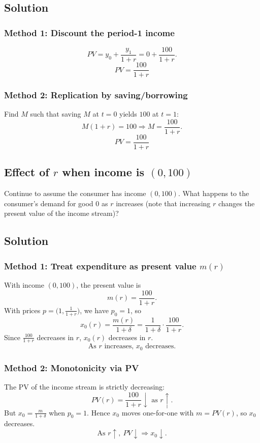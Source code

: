 \documentclass[12pt]{article}
\begin{document}
\subsection*{Solution}
\subsubsection*{Method 1: Discount the period-1 income}
\[
PV=y_0+\frac{y_1}{1+r}=0+\frac{100}{1+r}.
\]
\[
\boxed{\;PV=\frac{100}{1+r}\;}
\]

\subsubsection*{Method 2: Replication by saving/borrowing}
Find \(M\) such that saving \(M\) at \(t=0\) yields \(100\) at \(t=1\):
\[
M(1+r)=100\Rightarrow M=\frac{100}{1+r}.
\]
\[
\boxed{\;PV=\frac{100}{1+r}\;}
\]

\subsection{Effect of \(r\) when income is \((0,100)\)}
Continue to assume the consumer has income \((0,100)\). What happens to the consumer’s
demand for good 0 as \(r\) increases (note that increasing \(r\) changes the present value of
the income stream)?

\subsection*{Solution}
\subsubsection*{Method 1: Treat expenditure as present value \(m(r)\)}
With income \((0,100)\), the present value is
\[
m(r)=\frac{100}{1+r}.
\]
With prices \(p=\bigl(1,\frac{1}{1+r}\bigr)\), we have \(p_0=1\), so
\[
x_0(r)=\frac{m(r)}{1+\delta}=\frac{1}{1+\delta}\cdot\frac{100}{1+r}.
\]
Since \(\frac{100}{1+r}\) decreases in \(r\), \(x_0(r)\) decreases in \(r\).
\[
\boxed{\;\text{As }r\text{ increases, }x_0\text{ decreases.}\;}
\]

\subsubsection*{Method 2: Monotonicity via PV}
The PV of the income stream is strictly decreasing:
\[
PV(r)=\frac{100}{1+r}\downarrow \text{ as }r\uparrow.
\]
But \(x_0=\frac{m}{1+\delta}\) when \(p_0=1\). Hence \(x_0\) moves one-for-one with \(m=PV(r)\), so \(x_0\) decreases.
\[
\boxed{\;\text{As }r\uparrow,\ PV\downarrow\Rightarrow x_0\downarrow.\;}
\]
\end{document}
